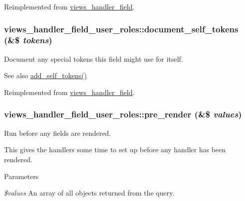 Reimplemented from \hyperlink{classviews__handler__field_a3d50050864c255b71c842972a45d39f6}{views\_\-handler\_\-field}.\hypertarget{classviews__handler__field__user__roles_a49745a7c1d16f9ee62d5ad6406fe0863}{
\subsubsection[{document\_\-self\_\-tokens}]{\setlength{\rightskip}{0pt plus 5cm}views\_\-handler\_\-field\_\-user\_\-roles::document\_\-self\_\-tokens (\&\$ {\em tokens})}}
\label{classviews__handler__field__user__roles_a49745a7c1d16f9ee62d5ad6406fe0863}
Document any special tokens this field might use for itself.

\begin{DoxySeeAlso}{See also}
\hyperlink{classviews__handler__field__user__roles_aceb9ebe1ca046eec3634c85bb6b114f5}{add\_\-self\_\-tokens()} 
\end{DoxySeeAlso}


Reimplemented from \hyperlink{classviews__handler__field_ae33446d1059f13fbfb06a37da04d320e}{views\_\-handler\_\-field}.\hypertarget{classviews__handler__field__user__roles_a34b555f61da756e5494e923e8188d3d7}{
\subsubsection[{pre\_\-render}]{\setlength{\rightskip}{0pt plus 5cm}views\_\-handler\_\-field\_\-user\_\-roles::pre\_\-render (\&\$ {\em values})}}
\label{classviews__handler__field__user__roles_a34b555f61da756e5494e923e8188d3d7}
Run before any fields are rendered.

This gives the handlers some time to set up before any handler has been rendered.


\begin{DoxyParams}{Parameters}
\item[{\em \$values}]An array of all objects returned from the query. \end{DoxyParams}


